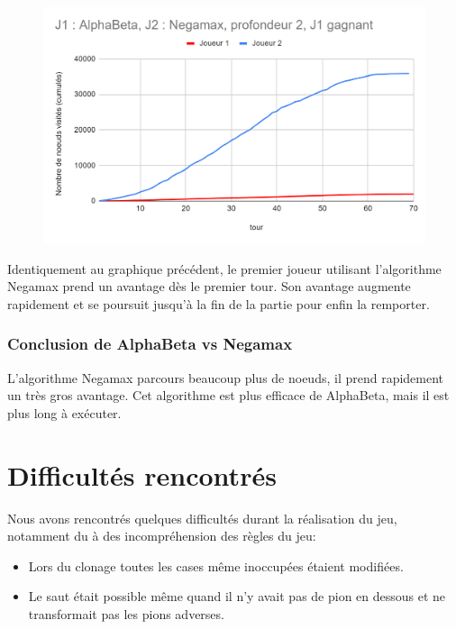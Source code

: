 \documentclass[12pt]{article}
\begin{document}
\begin{figure}[!h]
   \includegraphics[width=\textwidth]{prof2negamaxVSalpha.png}
\end{figure}

Identiquement au graphique précédent, le premier joueur utilisant l'algorithme Negamax prend un avantage dès le premier tour. Son avantage augmente rapidement et se poursuit jusqu'à la fin de la partie pour enfin la remporter.

\subsubsection{Conclusion de AlphaBeta vs Negamax}

L'algorithme Negamax parcours beaucoup plus de noeuds, il prend rapidement un très gros avantage.
Cet algorithme est plus efficace de AlphaBeta, mais il est plus long à exécuter.

\newpage
\section{Difficultés rencontrés}

Nous avons rencontrés quelques difficultés durant la réalisation du jeu, notamment du à des incompréhension des règles du jeu:\\

\begin{itemize}
    \item Lors du clonage toutes les cases même inoccupées étaient modifiées.
    \item Le saut était possible même quand il n'y avait pas de pion en dessous et ne transformait pas les pions adverses.
\end{itemize}
\end{document}

